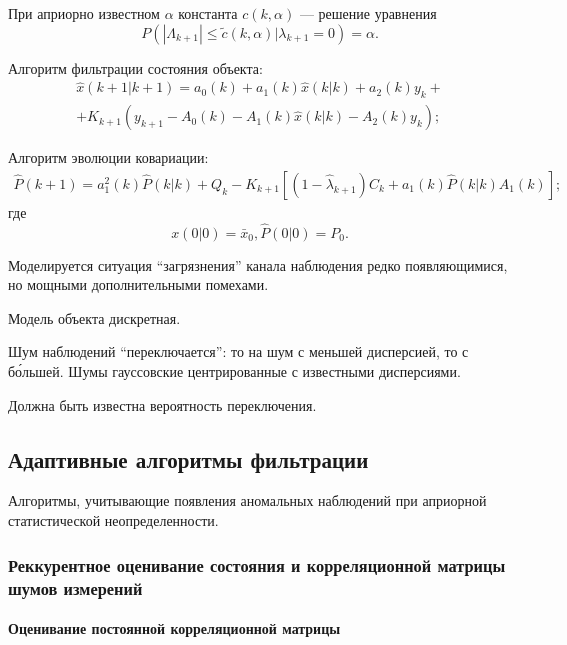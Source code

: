 \documentclass[a4paper,12pt]{article}
\begin{document}
При априорно известном $\alpha$ константа $c(k, \alpha)$ --- решение уравнения
\[ P(|\Lambda_{k+1}| \leq \tilde{c}(k, \alpha)|\lambda_{k+1} = 0) = \alpha .\]

Алгоритм фильтрации состояния объекта:
\begin{equation*}
	\begin{split}
	\hat{x}(k+1|k+1) = a_0(k) + a_1(k) \hat{x}(k|k) + a_2(k) y_k +\\
	+ K_{k+1} (y_{k+1} - A_0(k) - A_1(k) \hat{x}(k|k) - A_2(k) y_k);
	\end{split}
\end{equation*}

Алгоритм эволюции ковариации:
\begin{equation*}
	\begin{split}
		\hat{P}(k+1) = a_1^2(k) \hat{P}(k|k) + Q_k - K_{k+1}
		[(1-\hat{\lambda}_{k+1})C_k + a_1(k) \hat{P}(k|k) A_1(k)];
	\end{split}
\end{equation*}
\indent где
\[ x(0|0) = \bar{x}_0, \hat{P}(0|0) = P_0. \]

Моделируется ситуация ``загрязнения'' канала наблюдения редко появляющимися, но
мощными дополнительными помехами.

Модель объекта дискретная.

Шум наблюдений ``переключается'': то на шум с меньшей дисперсией, то с
б\'{о}льшей. Шумы гауссовские центрированные с известными дисперсиями.

Должна быть известна вероятность переключения.

\newpage

\subsection{Адаптивные алгоритмы фильтрации}

Алгоритмы, учитывающие появления аномальных наблюдений при априорной
статистической неопределенности.

\subsubsection{Реккурентное оценивание состояния и корреляционной матрицы шумов
измерений}

\paragraph{Оценивание постоянной корреляционной матрицы\\}
\end{document}

